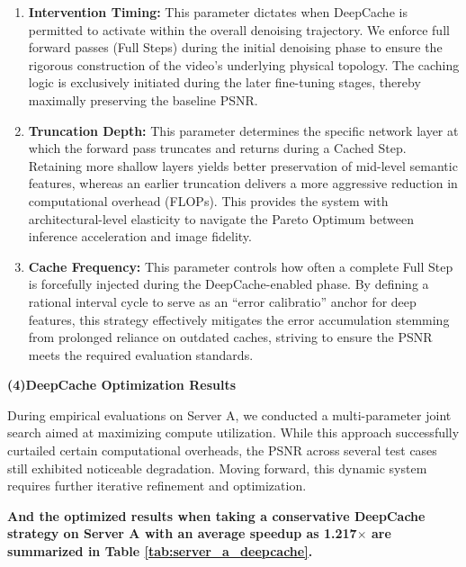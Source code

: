 \begin{enumerate}[label=(\arabic*), leftmargin=*]
    \item[1)]  \textbf{Intervention Timing:} This parameter dictates when DeepCache is permitted to activate within the overall denoising trajectory. We enforce full forward passes (Full Steps) during the initial denoising phase to ensure the rigorous construction of the video's underlying physical topology. The caching logic is exclusively initiated during the later fine-tuning stages, thereby maximally preserving the baseline PSNR.

    \item[2)]  \textbf{Truncation Depth:} This parameter determines the specific network layer at which the forward pass truncates and returns during a Cached Step. Retaining more shallow layers yields better preservation of mid-level semantic features, whereas an earlier truncation delivers a more aggressive reduction in computational overhead (FLOPs). This provides the system with architectural-level elasticity to navigate the Pareto Optimum between inference acceleration and image fidelity.

    \item[3)]  \textbf{Cache Frequency:} This parameter controls how often a complete Full Step is forcefully injected during the DeepCache-enabled phase. By defining a rational interval cycle to serve as an ``error calibratio'' anchor for deep features, this strategy effectively mitigates the error accumulation stemming from prolonged reliance on outdated caches, striving to ensure the PSNR meets the required evaluation standards.
\end{enumerate}

\textbf{(4)DeepCache Optimization Results}

During empirical evaluations on Server A, we conducted a multi-parameter joint search aimed at maximizing compute utilization. 
While this approach successfully curtailed certain computational overheads, the PSNR across several test cases still exhibited noticeable degradation. 
Moving forward, this dynamic system requires further iterative refinement and optimization.

\textbf{And the optimized results when taking a conservative DeepCache strategy on Server A with an average speedup as 1.217$\times$ are summarized in Table \ref{tab:server_a_deepcache}.}

